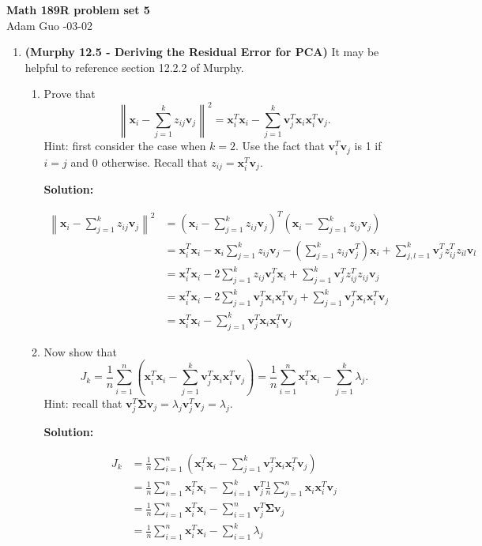 \documentclass[letter,11pt]{article}
\newenvironment{solution}{
    \vspace{0.16in} {\bf Solution:}
    
}{
	\vspace{0.16in}
}
\newcommand{\xx}{\bm{x}}
\newcommand{\vv}{\bm{v}}
\newcommand{\T}{T}
\newcommand{\Sigmab}{\bm{\Sigma}}
\begin{document}
\begin{center}
    {\bf \Large Math 189R problem set 5} \\
    \vspace{0.1in}
    Adam Guo -03-02
\end{center}

\begin{enumerate}
    \item \textbf{(Murphy 12.5 - Deriving the Residual Error for PCA)} It may be helpful to reference section 12.2.2 of Murphy.

    \begin{enumerate}
        \item Prove that \[\left\|\xx_i - \sum_{j=1}^k z_{ij}\vv_j\right\|^2 = \xx_i^\T\xx_i - \sum_{j=1}^k\vv_j^\T \xx_i\xx_i^\T \vv_j.\] Hint: first consider the case when $k=2$. Use the fact that $\vv_i^\T\vv_j$ is 1 if $i=j$ and 0 otherwise. Recall that $z_{ij} = \xx_i^\T\vv_j$.

        \begin{solution}
            \begin{align*}
                \left\| \xx_i - \sum_{j=1}^k z_{ij} \vv_j \right\|^2 &= (\xx_i - \sum_{j=1}^k z_{ij} \vv_j)^T (\xx_i - \sum_{j=1}^k z_{ij} \vv_j) \\
                &= \xx_i^T \xx_i - \xx_i \sum_{j=1}^k z_{ij} \vv_{j} - \left(\sum_{j=1}^k z_{ij} \vv_{j}^T\right) \xx_i + \sum_{j, l = 1}^k \vv_j^T z_{ij}^T z_{il} \vv_l \\
                &= \xx_i^T \xx_i - 2\sum_{j=1}^k z_{ij} \vv_j^T \xx_i + \sum_{j=1}^k \vv_j^T z_{ij}^T z_{ij} \vv_j \\
                &= \xx_i^T \xx_i - 2\sum_{j=1}^k \vv_j^T \xx_i \xx_i^T \vv_j + \sum_{j=1}^k \vv_j^T \xx_i \xx_i^T \vv_j \\
                &= \xx_i^T \xx_i - \sum_{j=1}^k \vv_j^T \xx_i \xx_i^T \vv_j
            \end{align*}
        \end{solution}

        \item Now show that \[J_k = \frac{1}{n}\sum_{i=1}^n \left(\xx_i^\T \xx_i - \sum_{j=1}^k\vv_j^\T \xx_i\xx_i^\T \vv_j\right) = \frac{1}{n}\sum_{i=1}^n \xx_i^\T\xx_i - \sum_{j=1}^k\lambda_j.\] Hint: recall that $\vv_j^\T \Sigmab \vv_j = \lambda_j\vv_j^\T\vv_j = \lambda_j$.

        \begin{solution}
            \begin{align*}
                J_k &= \frac1n \sum_{i=1}^n \left(\xx_i^T \xx_i - \sum_{j=1}^k \vv_j^T \xx_i \xx_i^T \vv_j\right) \\
                &= \frac1n \sum_{i=1}^n \xx_i^T \xx_i - \sum_{i=1}^k \vv_j^T \frac1n \sum_{j=1}^n \xx_i \xx_i^T \vv_j \\
                &= \frac1n \sum_{i=1}^n \xx_i^T \xx_i - \sum_{i=1}^n \vv_j^T \Sigmab \vv_j \\
                &= \frac1n \sum_{i=1}^n \xx_i^T \xx_i - \sum_{i=1}^k \lambda_j
            \end{align*}
        \end{solution}


\end{enumerate}
\end{enumerate}
\end{document}
